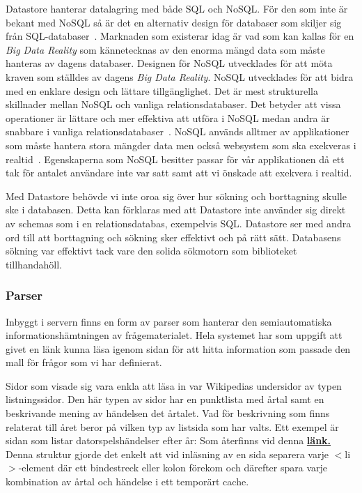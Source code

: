 \documentclass[a4paper, 11pt]{article}
\begin{document}
Datastore hanterar datalagring med både SQL och NoSQL. För den som inte är bekant med NoSQL så är det en alternativ design för databaser som skiljer sig från SQL-databaser~\cite{nosql}. Marknaden som existerar idag är vad som kan kallas för en \textit{Big Data Reality} som kännetecknas av den enorma mängd data som måste hanteras av dagens databaser. Designen för NoSQL utvecklades för att möta kraven som ställdes av dagens \textit{Big Data Reality}. NoSQL utvecklades för att bidra med en enklare design och lättare tillgänglighet. Det är mest strukturella skillnader mellan NoSQL och vanliga relationsdatabaser. Det betyder att vissa operationer är lättare och mer effektiva att utföra i NoSQL medan andra är snabbare i vanliga relationsdatabaser~\cite[1--3]{nosqlfacts}. NoSQL används alltmer av applikationer som måste hantera stora mängder data men också websystem som ska exekveras i realtid~\cite{nosqlcloud}. Egenskaperna som NoSQL besitter passar för vår applikationen då ett tak för antalet användare inte var satt samt att vi önskade att exekvera i realtid.

Med Datastore behövde vi inte oroa sig över hur sökning och borttagning skulle ske i databasen. Detta kan förklaras med att Datastore inte använder sig direkt av schemas som i en relationsdatabas, exempelvis SQL. Datastore ser med andra ord till att borttagning och sökning sker effektivt och på rätt sätt. Databasens sökning var effektivt tack vare den solida sökmotorn som biblioteket tillhandahöll.

\subsubsection{Parser} \label{crawler}
Inbyggt i servern finns en form av parser som hanterar den semiautomatiska informationshämtningen av frågematerialet. Hela systemet har som uppgift att givet en länk kunna läsa igenom sidan för att hitta information som passade den mall för frågor som vi har definierat. 

Sidor som visade sig vara enkla att läsa in var Wikipedias undersidor av typen listningssidor. Den här typen av sidor har en punktlista med årtal samt en beskrivande mening av händelsen det årtalet. Vad för beskrivning som finns relaterat till året beror på vilken typ av listsida som har valts. Ett exempel är sidan som listar datorspelshändelser efter år: Som återfinns vid denna  \textbf{\href{http://sv.wikipedia.org/wiki/Lista_\%C3\%B6ver_datorspels\%C3\%A5r}{länk.}} 
Denna struktur gjorde det enkelt att vid inläsning av en sida separera varje $<$li$>$-element där ett bindestreck eller kolon förekom och därefter spara varje kombination av årtal och händelse i ett temporärt cache.
\end{document}
